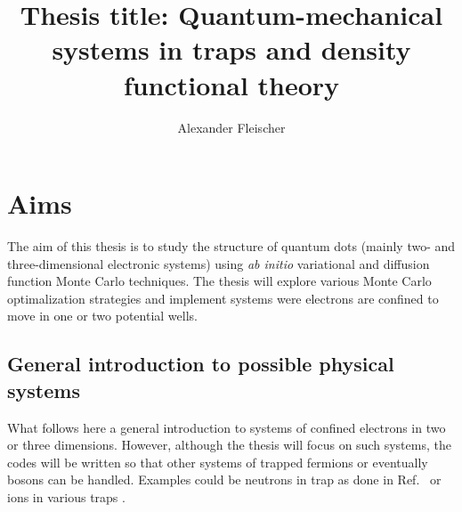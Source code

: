 \documentclass[twocolumn]{revtex4}
\begin{document}
\title{Thesis title: Quantum-mechanical systems in traps and density functional theory}
\author{Alexander Fleischer}
\maketitle
\section*{Aims}
The aim of this thesis is to study the structure of quantum dots
(mainly two- and three-dimensional electronic systems) using {\em ab initio} 
variational and diffusion function Monte Carlo
techniques. The thesis will explore various Monte Carlo optimalization
strategies and implement systems were electrons are confined to move
in one or two potential wells.

\subsection*{General introduction to possible physical systems}

What follows here a general introduction to systems of confined electrons in two or three dimensions.
However, although the thesis will focus on such systems, the codes will be written so that other systems of trapped 
fermions or eventually bosons can be handled. Examples could be neutrons in trap as done in Ref.~\cite{bogner2011} or ions in various traps \cite{yoram2008}.  
\end{document}
